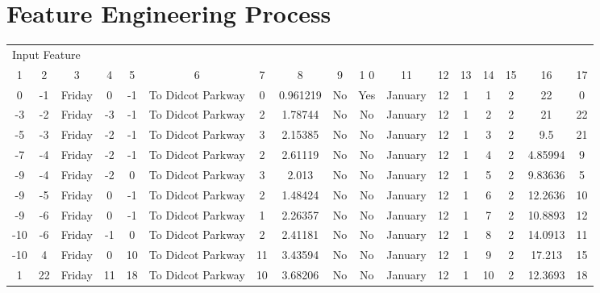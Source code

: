 \documentclass[]{interact}
\theoremstyle{plain}%
\theoremstyle{definition}
\theoremstyle{remark}
\begin{document}
\section{Feature Engineering Process}

\begin{table}[H]
{\begin{tabularx}{1.3\textwidth}{ccccccccccccccccc}\hline
\multicolumn{17}{l}{Input Feature} \\
1 & 2 & 3 & 4 & 5 & 6 & 7 & 8 & 9 & 1 0 & 11 & 12 & 13 & 14 & 15 & 16 & 17\\\hline
0 & -1 & Friday & 0 & -1 & To Didcot Parkway & 0 & 0.961219 & No & Yes & January & 12 & 1 & 1 & 2 & 22 & 0\\
-3 & -2 & Friday & -3 & -1 & To Didcot Parkway & 2 & 1.78744 & No & No & January & 12 & 1 & 2 & 2 & 21 & 22\\
-5 & -3 & Friday & -2 & -1 & To Didcot Parkway & 3 & 2.15385 & No & No & January & 12 & 1 & 3 & 2 & 9.5 & 21\\
-7 & -4 & Friday & -2 & -1 & To Didcot Parkway & 2 & 2.61119 & No & No & January & 12 & 1 & 4 & 2 & 4.85994 & 9\\
-9 & -4 & Friday & -2 & 0 & To Didcot Parkway & 3 & 2.013 & No & No & January & 12 & 1 & 5 & 2 & 9.83636 & 5\\
-9 & -5 & Friday & 0 & -1 & To Didcot Parkway & 2 & 1.48424 & No & No & January & 12 & 1 & 6 & 2 & 12.2636 & 10\\
-9 & -6 & Friday & 0 & -1 & To Didcot Parkway & 1 & 2.26357 & No & No & January & 12 & 1 & 7 & 2 & 10.8893 & 12\\
-10 & -6 & Friday & -1 & 0 & To Didcot Parkway & 2 & 2.41181 & No & No & January & 12 & 1 & 8 & 2 & 14.0913 & 11\\
-10 & 4 & Friday & 0 & 10 & To Didcot Parkway & 11 & 3.43594 & No & No & January & 12 & 1 & 9 & 2 & 17.213 & 15\\
1 & 22 & Friday & 11 & 18 & To Didcot Parkway & 10 & 3.68206 & No & No & January & 12 & 1 & 10 & 2 & 12.3693 & 18\\
\bottomrule
\end{tabularx}}
\label{table:PreprocessedData}
\end{table}
\end{document}

